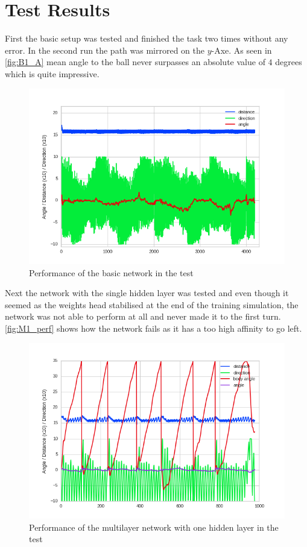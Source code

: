 \section{Test Results}
First the basic setup was tested and finished the task two times without any error. In the second run the path was mirrored on the $y$-Axe. As seen in \autoref{fig:B1_A} mean angle to the ball never surpasses an absolute value of $4$ degrees which is quite impressive.
\newline
\begin{figure}[htpb]
  \centering
  \includegraphics[scale=0.77]{figures/plots/newPlots/base1test_perf}%
  \caption{ Performance of the basic network in the test }
  \label{fig:B1_A}
\end{figure}
Next the network with the single hidden layer was tested and even though it seemed as the weights head stabilised at the end of the training simulation, the network was not able to perform at all and never made it to the first turn. \autoref{fig:M1_perf} shows how the network fails as it has a too high affinity to go left.
\begin{figure}[htpb]
  \centering
  \includegraphics[scale=0.77]{figures/plots/newPlots/m1test_perf}%
  \caption{ Performance of the multilayer network with one hidden layer in the test }
  \label{fig:M1_perf}
\end{figure}
